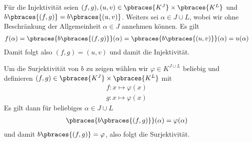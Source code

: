\begin{solution}
    Für die Injektivität seien $(f,g), (u,v) \in \pbraces{K^J} \times \pbraces{K^L}$ und $b\pbraces{(f,g)} = b\pbraces{(u,v)}$. Weiters sei $\alpha \in J \cup L$, wobei wir ohne Beschränkung der Allgemeinheit $\alpha \in J$ annehmen können. Es gilt 
    \begin{align*}
        f(\alpha) = \pbraces{b\pbraces{(f,g)}}(\alpha) = \pbraces{b\pbraces{(u,v)}}(\alpha) = u(\alpha)
    \end{align*}
    Damit folgt also $(f,g) = (u,v)$ und damit die Injektivität.

    Um die Surjektivität von $b$ zu zeigen wählen wir $\varphi \in K^{J \cup L}$ beliebig und definieren $(f,g) \in \pbraces{K^J} \times \pbraces{K^L}$ mit
    \begin{align*}
        f: x \mapsto \varphi(x) \\
        g: x \mapsto \varphi(x) 
    \end{align*} 
    Es gilt dann für beliebiges $\alpha \in J \cup L$
    \begin{align*}
        \pbraces{b\pbraces{(f,g)}}(\alpha) = \varphi(\alpha)
    \end{align*}
    und damit $b\pbraces{(f,g)} = \varphi$, also folgt die Surjektivität.
\end{solution}